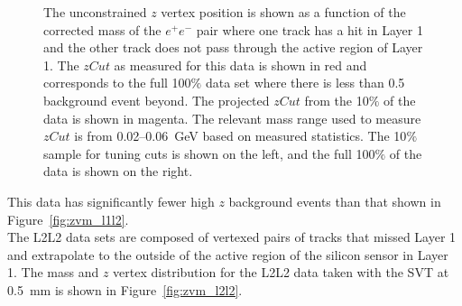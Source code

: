 \begin{figure}[hbt]
  \caption[$z$ vertex and mass distribution for the L1L2 data set with the SVT at $\pm1.5$~mm]{The unconstrained $z$ vertex position is shown as a function of the corrected mass
of the $e^+e^-$ pair where one track has a hit in Layer 1 and the other track does not pass through the active region of Layer 1. The $zCut$ as measured for this data is shown in red
and corresponds to the full 100$\%$ data set where there is less than 0.5 background event beyond. The projected $zCut$ from the 10$\%$ of the data is shown in magenta. The relevant mass range used to measure $zCut$ is from 0.02--0.06~GeV based on measured statistics. The 10$\%$ sample for tuning cuts is shown on the left, and the full 100$\%$ of the data is shown on the right.}
  \label{fig:zvm_l1l2_1p5}
\end{figure}
This data has significantly fewer high $z$ background events than that shown in Figure~\ref{fig:zvm_l1l2}.\\
\indent The L2L2 data sets are composed of vertexed pairs of tracks that missed Layer 1 and extrapolate to the outside of the active region of the silicon sensor in Layer 1. The mass and $z$ vertex distribution for the L2L2 data taken with the SVT at 0.5~mm is shown in Figure~\ref{fig:zvm_l2l2}.
